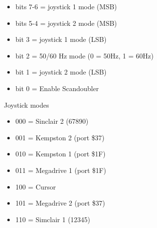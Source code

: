 \begin{itemize}
\item bits 7-6 = joystick 1 mode (MSB)
\item bits 5-4 = joystick 2 mode (MSB)
\item bit 3 = joystick 1 mode (LSB)
\item bit 2 = 50/60 Hz mode (0 = 50Hz, 1 = 60Hz)
\item bit 1 = joystick 2 mode (LSB)
\item bit 0 = Enable Scandoubler
\end{itemize}
Joystick modes
\begin{itemize}
\item 000 = Sinclair 2 (67890)
\item 001 = Kempston 2 (port \$37)
\item 010 = Kempston 1 (port \$1F)
\item 011 = Megadrive 1 (port \$1F)
\item 100 = Cursor
\item 101 = Megadrive 2 (port \$37)
\item 110 = Simclair 1 (12345)
\end{itemize}

